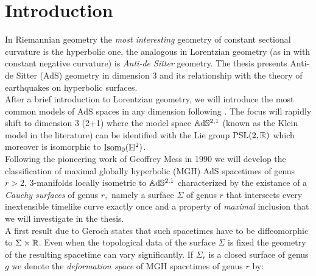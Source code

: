 \chapter*{Introduction}


In Riemannian geometry the \textit{most interesting} geometry of constant sectional curvature is the hyperbolic one, the analogous in Lorentzian geometry  (as in with constant negative curvature) is \textit{Anti-de Sitter} geometry. The thesis presents Anti-de Sitter (AdS) geometry in dimension 3 and its relationship with the theory of earthquakes on hyperbolic surfaces.\\ After a brief introduction to Lorentzian geometry, we will introduce the most common models of AdS spaces in any dimension following \cite{bonsanteseppi}. The focus will rapidly shift to dimension 3 (2+1) where the model space $\mathbb{A}\mathrm{d}\mathbb{S}^{2,1}$ (known as the Klein model in the literature) can be identified with the Lie group $\text{PSL}(2,\mathbb{R})$ which moreover is isomorphic to $\text{Isom}_0(\mathbb{H}^2)$.\\ Following the pioneering work of Geoffrey Mess in 1990 \cite{Mess} we will develop the classification of maximal globally hyperbolic (MGH) AdS spacetimes of genus $r>2$, 3-manifolds locally isometric to $\mathbb{A}\mathrm{d}\mathbb{S}^{2,1}$ characterized by the existance of a \textit{Cauchy surfaces} of genus $r,$ namely a surface $\Sigma$ of genus $r$ that intersects every inextensible timelike curve exactly once and a property of \textit{maximal} inclusion that we will investigate in the thesis.\\ A first result due to Geroch \cite{hawking2023large} states that such spacetimes have to be diffeomorphic to $\Sigma\times\mathbb{R}$. Even when the topological data of the surface $\Sigma$ is fixed the geometry of the resulting spacetime can vary significantly. If $\Sigma_r$ is a closed surface of genus $g$ we denote the \textit{deformation space} of MGH spacetimes of genus $r$ by:

